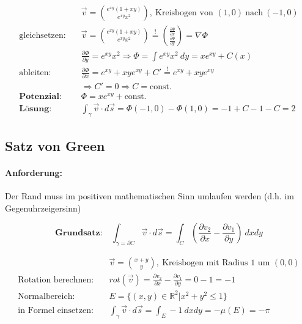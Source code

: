 \documentclass[11pt]{article}
\begin{document}
\begin{equation*}
\begin{split}
	& \vec{v} = \binom{e^{xy}(1 + xy)}{e^{xy}x^2},\ \text{Kreisbogen von } (1,0)\ \text{nach}\ (-1,0) \\
	\text{gleichsetzen:}\quad & \vec{v} = \binom{e^{xy}(1 + xy)}{e^{xy}x^2} \overset{!}{=} \binom{\frac{\partial\Phi}{\partial x}}{\frac{\partial\Phi}{\partial y}} = \nabla\Phi \\
	& \frac{\partial\Phi}{\partial y} = e^{xy}x^2 \Rightarrow \Phi = \int e^{xy}x^2\ dy = xe^{xy} + C(x) \\
	\text{ableiten:}\quad & \frac{\partial\Phi}{\partial x} = e^{xy} + xye^{xy} + C' \overset{!}{=} e^{xy} + xye^{xy} \\
	& \Rightarrow C' = 0 \Rightarrow C = \text{const.} \\
	\textbf{Potenzial:}\quad & \Phi = xe^{xy} + \text{const.} \\
	\textbf{L{\"o}sung:}\quad & \int_\gamma \vec{v} \cdot d\vec{s} = \Phi(-1,0) - \Phi(1,0) = -1 + C -1 - C = 2
\end{split}
\end{equation*}

\subsection{Satz von Green}

\paragraph{Anforderung:} Der Rand muss im positiven mathematischen Sinn umlaufen werden (d.h. im Gegenuhrzeigersinn)

\begin{equation*}
	\textbf{Grundsatz:}\quad\int_{\gamma = \partial C} \vec{v} \cdot d\vec{s} = \int_C (\frac{\partial v_2}{\partial x}-\frac{\partial v_1}{\partial y})\ dxdy
\end{equation*}

\begin{equation*}
\begin{split}
	& \vec{v} = \binom{x+y}{y},\ \text{Kreisbogen mit Radius $1$ um $(0,0)$} \\
	\text{Rotation berechnen:}\quad & rot(\vec{v}) = \frac{\partial v_2}{\partial x}-\frac{\partial v_1}{\partial y} = 0 -1 = -1 \\
	\text{Normalbereich:}\quad & E = \{(x,y) \in \mathbb{R}^2 | x^2 + y^2 \leq 1 \} \\
	\text{in Formel einsetzen:}\quad & \int_\gamma \vec{v} \cdot d\vec{s} = \int_E -1\ dxdy = -\mu(E) = -\pi
\end{split}
\end{equation*}
\end{document}
